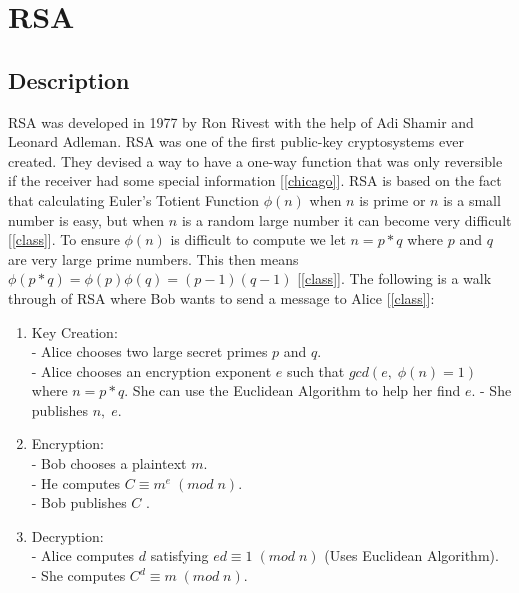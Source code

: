 \documentclass[12pt]{article}
\begin{document}
\section{RSA}

\subsection{Description}
RSA was developed in 1977 by Ron Rivest with the help of Adi Shamir and Leonard Adleman. RSA was one of the first public-key cryptosystems ever created. They devised a way to have a one-way function that was only reversible if the receiver had some special information [\ref{chicago}]. RSA is based on the fact that calculating Euler's Totient Function $\phi(n)$ when $n$ is prime or $n$ is a small number is easy, but when $n$ is a random large number it can become very difficult [\ref{class}]. To ensure $\phi(n)$ is difficult to compute we let $n=p*q$ where $p$ and $q$ are very large prime numbers. This then means $\phi(p*q)=\phi(p)\phi(q)=(p-1)(q-1)$ [\ref{class}]. The following is a walk through of RSA where Bob wants to send a message to Alice [\ref{class}]:\\
\begin{enumerate}
  \item Key Creation: \\
    - Alice chooses two large secret primes $p$ and $q$. \\
    - Alice chooses an encryption exponent $e$ such that $gcd(e,\;\phi(n)=1)$ where $n=p*q$. She can use the Euclidean Algorithm to help her find $e$.
    - She publishes $n,\;e$.
  \item Encryption:\\
    - Bob chooses a plaintext $m$.\\
    - He computes $C\equiv m^e\;(mod\;n)$.\\
    - Bob publishes $C$ .
  \item Decryption:\\
    - Alice computes $d$ satisfying $ed\equiv1\;(mod\;n)$ (Uses Euclidean Algorithm).\\
    - She computes $C^d\equiv m\;(mod\;n)$.
\end{enumerate}
\end{document}
